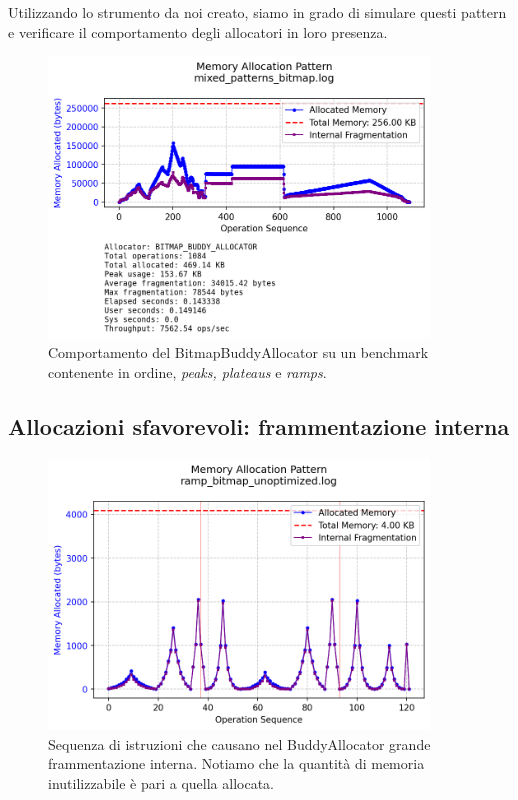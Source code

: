 Utilizzando lo strumento da noi creato, siamo in grado di simulare questi pattern e verificare il comportamento degli allocatori in loro presenza. 

\begin{figure}[H]
  \centering
  \includegraphics[width=0.9\textwidth]{graphs/mixed_patterns_bitmap.png}
  \caption{Comportamento del BitmapBuddyAllocator su un benchmark contenente in ordine, \textit{peaks, plateaus} e \textit{ramps}.}
  \label{fig:mixed_patterns_bitmap}
\end{figure}



\subsection{Allocazioni sfavorevoli: frammentazione interna}

\begin{figure}[H]
  \centering
  \includegraphics[width=0.9\textwidth]{graphs/ramp_bitmap_unoptimized.png}
  \caption{Sequenza di istruzioni che causano nel BuddyAllocator grande frammentazione interna. Notiamo che la quantità di memoria inutilizzabile è pari a quella allocata.}
  \label{fig:ramp_bitmap_unoptimized}
\end{figure}

